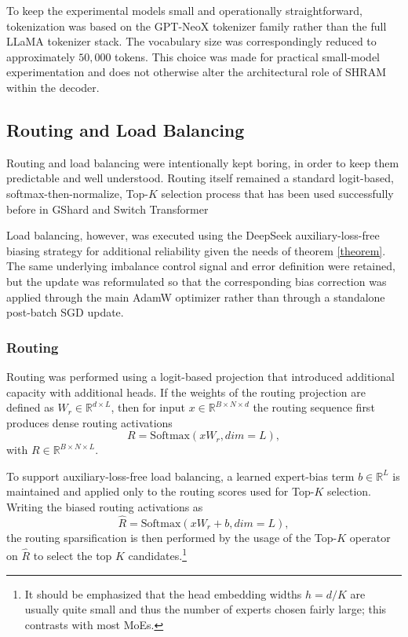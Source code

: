 \documentclass[11pt]{article}
\begin{document}
To keep the experimental models small and operationally straightforward, tokenization was based on the GPT-NeoX tokenizer family rather than the full LLaMA tokenizer stack. The vocabulary size was correspondingly reduced to approximately $50{,}000$ tokens. This choice was made for practical small-model experimentation and does not otherwise alter the architectural role of SHRAM within the decoder.


\subsection{Routing and Load Balancing}
\label{app:load_balancing}

Routing and load balancing were intentionally kept boring, in order to keep them predictable and well understood. Routing itself remained a standard logit-based, softmax-then-normalize, Top-$K$ selection process that has been used successfully before in GShard and Switch Transformer \cite{lepikhin2020gshard, fedus2021switch}

Load balancing, however, was executed using the DeepSeek auxiliary-loss-free biasing strategy \cite{wang2024auxiliarylossfree} for additional reliability given the needs of theorem \ref{theorem}. The same underlying imbalance control signal and error definition were retained, but the update was reformulated so that the corresponding bias correction was applied through the main AdamW optimizer rather than through a standalone post-batch SGD update.

\subsubsection{Routing}

Routing was performed using a logit-based projection that introduced additional capacity with additional heads. If the weights of the routing projection are defined as $W_r \in \mathbb{R}^{d \times L}$, then for input $x \in \mathbb{R}^{B \times N \times d}$ the routing sequence first produces dense routing activations
\[
R = \mathrm{Softmax}(xW_r, dim=L),
\]
with $R \in \mathbb{R}^{B \times N \times L}$.

To support auxiliary-loss-free load balancing, a learned expert-bias term $b \in \mathbb{R}^{L}$ is maintained and applied only to the routing scores used for Top-$K$ selection. Writing the biased routing activations as
\[
\hat{R} = \mathrm{Softmax}(xW_r + b, dim=L),
\]
the routing sparsification is then performed by the usage of the Top-$K$ operator on $\hat{R}$ to select the top $K$ candidates.\footnote{It should be emphasized that the head embedding widths $h=d/K$ are usually quite small and thus the number of experts chosen fairly large; this contrasts with most MoEs.}
\end{document}
